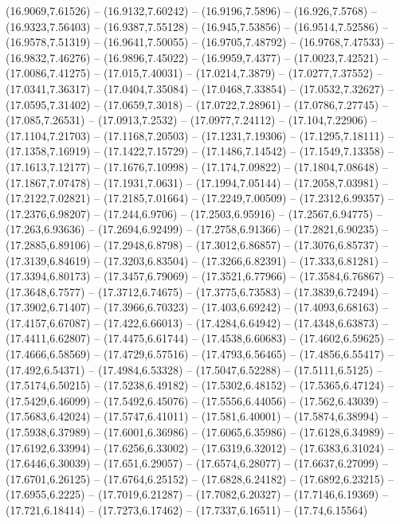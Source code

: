 {(16.9069,7.61526) -- (16.9132,7.60242) -- (16.9196,7.5896) -- (16.926,7.5768) -- (16.9323,7.56403) -- (16.9387,7.55128) -- (16.945,7.53856) -- (16.9514,7.52586) -- (16.9578,7.51319) -- (16.9641,7.50055) -- (16.9705,7.48792) -- (16.9768,7.47533) --
(16.9832,7.46276) -- (16.9896,7.45022) -- (16.9959,7.4377) -- (17.0023,7.42521) -- (17.0086,7.41275) -- (17.015,7.40031) -- (17.0214,7.3879) -- (17.0277,7.37552) -- (17.0341,7.36317) -- (17.0404,7.35084) -- (17.0468,7.33854) -- (17.0532,7.32627) --
(17.0595,7.31402) -- (17.0659,7.3018) -- (17.0722,7.28961) -- (17.0786,7.27745) -- (17.085,7.26531) -- (17.0913,7.2532) -- (17.0977,7.24112) -- (17.104,7.22906) -- (17.1104,7.21703) -- (17.1168,7.20503) -- (17.1231,7.19306) -- (17.1295,7.18111) --
(17.1358,7.16919) -- (17.1422,7.15729) -- (17.1486,7.14542) -- (17.1549,7.13358) -- (17.1613,7.12177) -- (17.1676,7.10998) -- (17.174,7.09822) -- (17.1804,7.08648) -- (17.1867,7.07478) -- (17.1931,7.0631) -- (17.1994,7.05144) -- (17.2058,7.03981) --
(17.2122,7.02821) -- (17.2185,7.01664) -- (17.2249,7.00509) -- (17.2312,6.99357) -- (17.2376,6.98207) -- (17.244,6.9706) -- (17.2503,6.95916) -- (17.2567,6.94775) -- (17.263,6.93636) -- (17.2694,6.92499) -- (17.2758,6.91366) -- (17.2821,6.90235) --
(17.2885,6.89106) -- (17.2948,6.8798) -- (17.3012,6.86857) -- (17.3076,6.85737) -- (17.3139,6.84619) -- (17.3203,6.83504) -- (17.3266,6.82391) -- (17.333,6.81281) -- (17.3394,6.80173) -- (17.3457,6.79069) -- (17.3521,6.77966) -- (17.3584,6.76867) --
(17.3648,6.7577) -- (17.3712,6.74675) -- (17.3775,6.73583) -- (17.3839,6.72494) -- (17.3902,6.71407) -- (17.3966,6.70323) -- (17.403,6.69242) -- (17.4093,6.68163) -- (17.4157,6.67087) -- (17.422,6.66013) -- (17.4284,6.64942) -- (17.4348,6.63873) --
(17.4411,6.62807) -- (17.4475,6.61744) -- (17.4538,6.60683) -- (17.4602,6.59625) -- (17.4666,6.58569) -- (17.4729,6.57516) -- (17.4793,6.56465) -- (17.4856,6.55417) -- (17.492,6.54371) -- (17.4984,6.53328) -- (17.5047,6.52288) -- (17.5111,6.5125) --
(17.5174,6.50215) -- (17.5238,6.49182) -- (17.5302,6.48152) -- (17.5365,6.47124) -- (17.5429,6.46099) -- (17.5492,6.45076) -- (17.5556,6.44056) -- (17.562,6.43039) -- (17.5683,6.42024) -- (17.5747,6.41011) -- (17.581,6.40001) -- (17.5874,6.38994) --
(17.5938,6.37989) -- (17.6001,6.36986) -- (17.6065,6.35986) -- (17.6128,6.34989) -- (17.6192,6.33994) -- (17.6256,6.33002) -- (17.6319,6.32012) -- (17.6383,6.31024) -- (17.6446,6.30039) -- (17.651,6.29057) -- (17.6574,6.28077) -- (17.6637,6.27099)
-- (17.6701,6.26125) -- (17.6764,6.25152) -- (17.6828,6.24182) -- (17.6892,6.23215) -- (17.6955,6.2225) -- (17.7019,6.21287) -- (17.7082,6.20327) -- (17.7146,6.19369) -- (17.721,6.18414) -- (17.7273,6.17462) -- (17.7337,6.16511) -- (17.74,6.15564)
}
